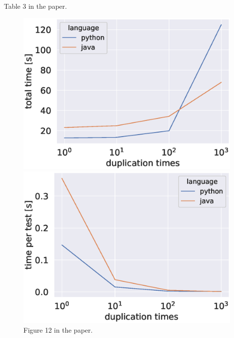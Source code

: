 \documentclass{article}
\begin{document}
\begin{table}
    \begin{small}
        \centering
        \caption{Table 3 in the paper.}
        \begin{minipage}[t]{\textwidth}
            \centering
            
        \end{minipage}
        \hspace{3pt}
        \begin{minipage}[t]{\textwidth}
            \centering
            
        \end{minipage}
    \end{small}
\end{table}

\begin{figure}
    \begin{small}
        \centering
        \begin{minipage}[t]{\textwidth}
            \centering
            \includegraphics[width=.5\textwidth]{figure_exp_standalone_time.eps}
        \end{minipage}
        \begin{minipage}[t]{\textwidth}
            \centering
            \includegraphics[width=.5\textwidth]{figure_exp_standalone_timept.eps}
        \end{minipage}
        \caption{Figure 12 in the paper.}
    \end{small}
\end{figure}
\end{document}
